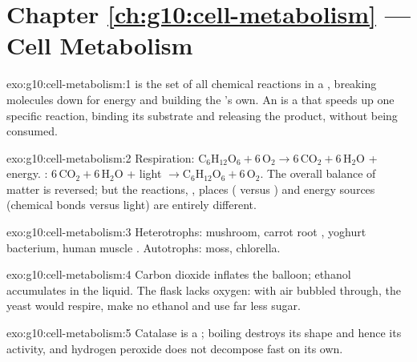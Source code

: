 \section*{Chapter \ref{ch:g10:cell-metabolism} --- Cell Metabolism}

\begin{solution}{exo:g10:cell-metabolism:1}
 is the set of all chemical reactions in a , breaking
molecules down for energy and building the 's own. An  is a
 that speeds up one specific reaction, binding its substrate
and releasing the product, without being consumed.
\end{solution}

\begin{solution}{exo:g10:cell-metabolism:2}
Respiration: $\mathrm{C_6H_{12}O_6} + 6\,\mathrm{O_2} \to
6\,\mathrm{CO_2} + 6\,\mathrm{H_2O}$ + energy. :
$6\,\mathrm{CO_2} + 6\,\mathrm{H_2O}$ + light $\to \mathrm{C_6H_{12}O_6}
+ 6\,\mathrm{O_2}$. The overall balance of matter is reversed; but the
reactions, , places ( versus ) and
energy sources (chemical bonds versus light) are entirely different.
\end{solution}

\begin{solution}{exo:g10:cell-metabolism:3}
Heterotrophs: mushroom, carrot root , yoghurt bacterium, human
muscle . Autotrophs: moss, chlorella.
\end{solution}

\begin{solution}{exo:g10:cell-metabolism:4}
Carbon dioxide inflates the balloon; ethanol accumulates in the
liquid. The flask lacks oxygen: with air bubbled through, the yeast
would respire, make no ethanol and use far less sugar.
\end{solution}

\begin{solution}{exo:g10:cell-metabolism:5}
Catalase is a ; boiling destroys its shape and hence its
activity, and hydrogen peroxide does not decompose fast on its own.
\end{solution}

